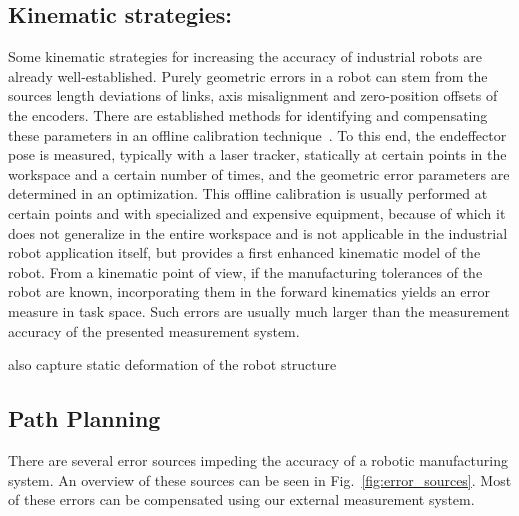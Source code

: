 \documentclass[5p,times,procedia]{elsarticle}
\begin{document}
\subsection{Kinematic strategies:}
Some kinematic strategies for increasing the accuracy of industrial robots are already well-established.
Purely geometric errors in a robot can stem from the sources length deviations of links, axis misalignment and zero-position offsets of the encoders.
There are established methods for identifying and compensating these parameters in an offline calibration technique~\cite{Wiest01}.
To this end, the endeffector pose is measured, typically with a laser tracker, statically at certain points in the workspace and a certain number of times, and the geometric error parameters are determined in an optimization.
This offline calibration is usually performed at certain points and with specialized and expensive equipment, because of which it does not generalize in the entire workspace and is not applicable in the industrial robot application itself, but provides a first enhanced kinematic model of the robot.
From a kinematic point of view, if the manufacturing tolerances of the robot are known, incorporating them in the forward kinematics yields an error measure in task space. Such errors are usually much larger than the measurement accuracy of the presented measurement system.

also capture static deformation of the robot structure


\subsection{Path Planning}
There are several error sources impeding the accuracy of a robotic manufacturing system.
An overview of these sources can be seen in Fig.~\ref{fig:error_sources}.
Most of these errors can be compensated using our external measurement system.
\end{document}
